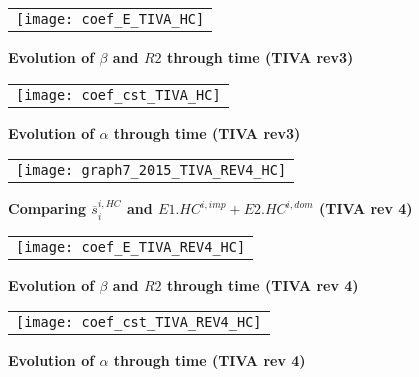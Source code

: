 \documentclass[11pt,a4paper]{article}
\begin{document}
\begin{figure}[!h]
	\centering
	\caption{\footnotesize{\textbf{Evolution of $\beta$ and $R2$ through time (TIVA rev3)}}}
	\begin{tabular}{c}
		\texttt{[image: coef\_E\_TIVA\_HC]}\\
	\end{tabular}
	\label{fig:evolution_b_TiVA}
\end{figure}

\begin{figure}[!h]
	\centering
	\caption{\footnotesize{\textbf{Evolution of $\alpha$ through time (TIVA rev3)}}}
	\begin{tabular}{c}
		\texttt{[image: coef\_cst\_TIVA\_HC]}\\
	\end{tabular}
	\label{fig:evolution_cst_TiVA}
\end{figure}

\begin{figure}[!h]
	\centering
	\caption{\footnotesize{\textbf{Comparing $\overline{s}_{i}^{i,HC}$ and $E1.HC^{i,imp}+E2.HC^{i,dom}$ (TIVA rev 4)}}}
	\begin{tabular}{c}
		\texttt{[image: graph7\_2015\_TIVA\_REV4\_HC]}\\
	\end{tabular}
	\label{fig:ratiodir_TiVA_REV4}
\end{figure}

\begin{figure}[!h]
	\centering
	\caption{\footnotesize{\textbf{Evolution of $\beta$ and $R2$ through time (TIVA rev 4)}}}
	\begin{tabular}{c}
		\texttt{[image: coef\_E\_TIVA\_REV4\_HC]}\\
	\end{tabular}
	\label{fig:evolution_b_TiVA_REV4}
\end{figure}

\begin{figure}[!h]
	\centering
	\caption{\footnotesize{\textbf{Evolution of $\alpha$ through time (TIVA rev 4)}}}
	\begin{tabular}{c}
		\texttt{[image: coef\_cst\_TIVA\_REV4\_HC]}\\
	\end{tabular}
	\label{fig:evolution_cst_TiVA_REV4}
\end{figure}
\end{document}
